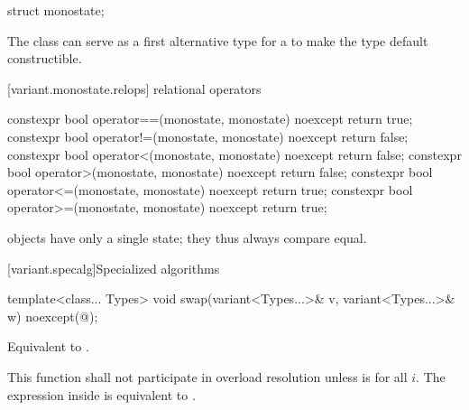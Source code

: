 \begin{itemdecl}
struct monostate{};
\end{itemdecl}

\begin{itemdescr}
\pnum
The class  can serve as a first alternative type for
a  to make the  type default constructible.
\end{itemdescr}


[variant.monostate.relops]{ relational operators}

%
%
%
%
%
%
\begin{itemdecl}
constexpr bool operator==(monostate, monostate) noexcept { return true; }
constexpr bool operator!=(monostate, monostate) noexcept { return false; }
constexpr bool operator<(monostate, monostate) noexcept { return false; }
constexpr bool operator>(monostate, monostate) noexcept { return false; }
constexpr bool operator<=(monostate, monostate) noexcept { return true; }
constexpr bool operator>=(monostate, monostate) noexcept { return true; }
\end{itemdecl}

\begin{itemdescr}
\pnum
\begin{note}  objects have only a single state; they thus always compare equal.\end{note}
\end{itemdescr}


[variant.specalg]{Specialized algorithms}

%
\begin{itemdecl}
template<class... Types>
  void swap(variant<Types...>& v, variant<Types...>& w) noexcept(@\seebelow@);
\end{itemdecl}

\begin{itemdescr}
\pnum
\effects Equivalent to .

\pnum
\remarks This function shall not participate in overload resolution
unless 
is  for all $i$.
The expression inside  is equivalent to .
\end{itemdescr}

